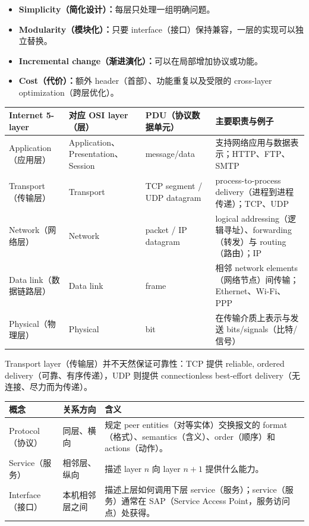 \begin{itemize}
  \item \textbf{Simplicity（简化设计）：}每层只处理一组明确问题。
  \item \textbf{Modularity（模块化）：}只要 interface（接口）保持兼容，一层的实现可以独立替换。
  \item \textbf{Incremental change（渐进演化）：}可以在局部增加协议或功能。
  \item \textbf{Cost（代价）：}额外 header（首部）、功能重复以及受限的 cross-layer optimization（跨层优化）。
\end{itemize}

\begin{center}
\small
\begin{tabularx}{\textwidth}{@{}>{\raggedright\arraybackslash}p{2.4cm}>{\raggedright\arraybackslash}p{2.8cm}>{\raggedright\arraybackslash}p{2.4cm}>{\raggedright\arraybackslash}X@{}}
  \toprule
  Internet 5-layer & 对应 OSI layer（层） & PDU（协议数据单元） & 主要职责与例子 \\
  \midrule
  Application（应用层） & Application、Presentation、Session & message/data & 支持网络应用与数据表示；HTTP、FTP、SMTP \\
  Transport（传输层） & Transport & TCP segment / UDP datagram & process-to-process delivery（进程到进程传递）；TCP、UDP \\
  Network（网络层） & Network & packet / IP datagram & logical addressing（逻辑寻址）、forwarding（转发）与 routing（路由）；IP \\
  Data link（数据链路层） & Data link & frame & 相邻 network elements（网络节点）间传输；Ethernet、Wi-Fi、PPP \\
  Physical（物理层） & Physical & bit & 在传输介质上表示与发送 bits/signals（比特/信号） \\
  \bottomrule
\end{tabularx}
\end{center}

Transport layer（传输层）并不天然保证可靠性：TCP 提供 reliable, ordered delivery（可靠、有序传递），UDP 则提供 connectionless best-effort delivery（无连接、尽力而为传递）。


\begin{center}
\small
\begin{tabularx}{\textwidth}{@{}>{\raggedright\arraybackslash}p{2.8cm}>{\raggedright\arraybackslash}p{2.5cm}>{\raggedright\arraybackslash}X@{}}
  \toprule
  概念 & 关系方向 & 含义 \\
  \midrule
  Protocol（协议） & 同层、横向 & 规定 peer entities（对等实体）交换报文的 format（格式）、semantics（含义）、order（顺序）和 actions（动作）。 \\
  Service（服务） & 相邻层、纵向 & 描述 layer $n$ 向 layer $n+1$ 提供什么能力。 \\
  Interface（接口） & 本机相邻层之间 & 描述上层如何调用下层 service（服务）；service（服务）通常在 SAP（Service Access Point，服务访问点）处获得。 \\
  \bottomrule
\end{tabularx}
\end{center}

